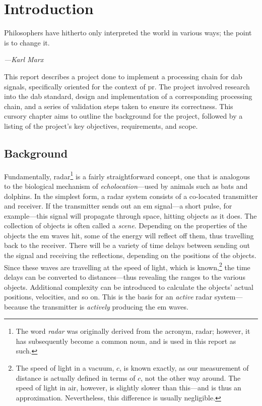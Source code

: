 \documentclass[class=report,11pt,crop=false]{standalone}
\begin{document}
\chapter{Introduction}
\epigraph{Philosophers have hitherto only interpreted the world in various ways; the point is to change it.}%
    {\emph{---Karl Marx}}

This report describes a project done to implement a processing chain for \gls{dab} signals, specifically oriented for the context of \gls{pr}. The project involved research into the \gls{dab} standard, design and implementation of a corresponding processing chain, and a series of validation steps taken to ensure its correctness. This cursory chapter aims to outline the background for the project, followed by a listing of the project's key objectives, requirements, and scope.

\section{Background}
Fundamentally, radar\footnote{The word \emph{radar} was originally derived from the acronym, \acrlong{radar}; however, it has subsequently become a common noun, and is used in this report as such.} is a fairly straightforward concept, one that is analogous to the biological mechanism of \emph{echolocation}---used by animals such as bats and dolphins. In the simplest form, a radar system consists of a co-located transmitter and receiver. If the transmitter sends out an \gls{em} signal---a short pulse, for example---this signal will propagate through space, hitting objects as it does. The collection of objects is often called a \emph{scene}. Depending on the properties of the objects the \gls{em} waves hit, some of the energy will reflect off them, thus travelling back to the receiver. There will be a variety of time delays between sending out the signal and receiving the reflections, depending on the positions of the objects. Since these waves are travelling at the speed of light, which is known,\footnote{The speed of light in a vacuum, \(c\), is known exactly, as our measurement of distance is actually defined in terms of \(c\), not the other way around. The speed of light in air, however, is slightly slower than this---and is thus an approximation. Nevertheless, this difference is usually negligible.} the time delays can be converted to distances---thus revealing the ranges to the various objects. Additional complexity can be introduced to calculate the objects' actual positions, velocities, and so on. This is the basis for an \emph{active} radar system---because the transmitter is \emph{actively} producing the \gls{em} waves.
\end{document}

